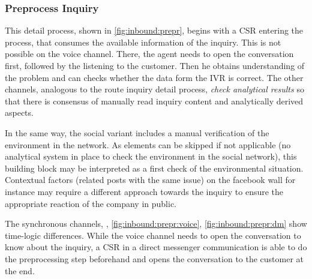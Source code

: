 \subsubsection{Preprocess Inquiry}

This detail process, shown in \Fig \ref{fig:inbound:prepr}, begins with a \acrshort{CSR} entering the process, that consumes the available information of the inquiry. This is not possible on the voice channel. There, the agent needs to open the conversation first, followed by the listening to the customer. Then he obtains understanding of the problem and can checks whether the data form the \acrshort{IVR} is correct. The other channels, analogous to the route inquiry detail process, \textit{check analytical results} so that there is consensus of manually read inquiry content and analytically derived aspects.

In the same way, the social variant includes a manual verification of the environment in the network. As elements can be skipped if not applicable (\ie no analytical system in place to check the environment in the social network), this building block may be interpreted as a first check of the environmental situation. Contextual factors (related posts with the same issue) on the facebook wall for instance may require a different approach towards the inquiry to ensure the appropriate reaction of the company in public.   

The synchronous channels, \ie, \Fig \ref{fig:inbound:prepr:voice}, \ref{fig:inbound:prepr:dm} show time-logic differences. While the voice channel needs to open the conversation to know about the inquiry, a \acrshort{CSR} in a direct messenger communication is able to do the preprocessing step beforehand and opens the conversation to the customer at the end. 

